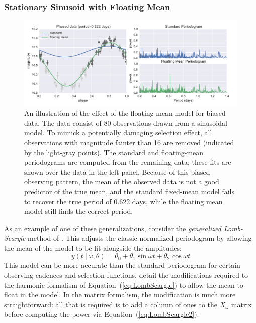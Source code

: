 \documentclass[12pt,preprint]{aastex}
\newcommand{\figlabel}[1]{\label{fig:#1}}
\newcommand{\Eq}[1]{Equation~(\ref{eq:#1})}
\newcommand{\eq}[1]{\Eq{#1}}
\newcommand{\sectlabel}[1]{\label{sect:#1}}
\begin{document}
\subsubsection{Stationary Sinusoid with Floating Mean}
\sectlabel{floating_mean}

\begin{figure}
  \centering
  \includegraphics[width=\textwidth]{fig02.pdf}
  \caption{
    An illustration of the effect of the floating mean model for biased data.
    The data consist of 80 observations drawn from a sinusoidal model. To mimick a potentially damaging selection effect, all observations with magnitude fainter than 16 are removed (indicated by the light-gray points). The standard and floating-mean periodograms are computed from the remaining data; these fits are shown over the data in the left panel. Because of this biased observing pattern, the mean of the observed data is not a good predictor of the true mean, and the standard fixed-mean model fails to recover the true period of 0.622 days, while the floating mean model still finds the correct period.
  }
  \figlabel{floating_mean}
\end{figure}

As an example of one of these generalizations, consider the {\it generalized Lomb-Scargle} method of \citet{Zechmeister09}. This adjusts the classic normalized periodogram by allowing the mean of the model to be fit alongside the amplitudes:
\begin{equation}
  y(t~|~\omega, \theta) = \theta_0 + \theta_1\sin\omega t + \theta_2\cos\omega t
\end{equation}
This model can be more accurate than the standard periodogram for certain observing cadences and selection functions. \citet{Zechmeister09} detail the modifications required to the harmonic formalism of \eq{LombScargle} to allow the mean to float in the model. In the matrix formalism, the modification is much more straightforward: all that is required is to add a column of ones to the $X_\omega$ matrix before computing the power via \eq{LombScargle2}.
\end{document}

